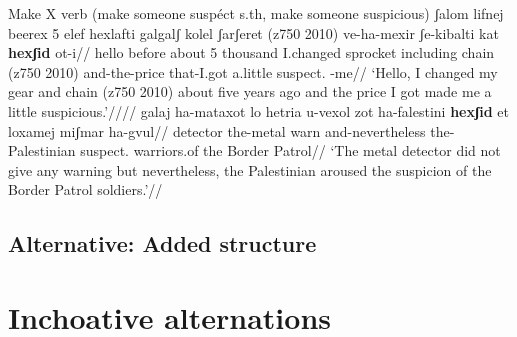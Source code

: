 \pex Make X verb (make someone suspéct s.th, make someone suspicious)
	\a \begingl
		\gla ʃalom lifnej beerex 5 elef hexlafti galgalʃ kolel ʃarʃeret (z750 2010) ve-ha-mexir ʃe-kibalti k{\texttslig}at \textbf{hexʃid} ot-i//
		\glb hello before about 5 thousand I.changed sprocket including chain (z750 2010) and-the-price that-I.got a.little suspect. -me//
		\glft `Hello, I changed my gear and chain (z750 2010) about five years ago and the price I got made me a little suspicious.'////
	\endgl
	\a \begingl
		\gla galaj ha-mataxot lo hetria u-{vexol zot} ha-falestini \textbf{hexʃid} et loxamej {miʃmar ha-gvul}//
		\glb detector the-metal  warn and-nevertheless the-Palestinian suspect.  warriors.of {the Border Patrol}//
		\glft `The metal detector did not give any warning but nevertheless, the Palestinian aroused the suspicion of the Border Patrol soldiers.'//
	\endgl
\xe



%	
%	
%	
%


	
	\subsection{Alternative: Added structure}



\section{Inchoative alternations}



